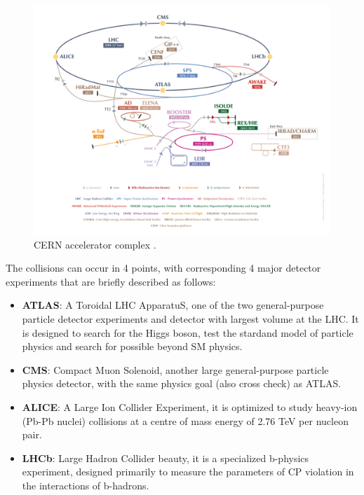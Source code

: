 \begin{figure}[!htb]
  \centering
  \includegraphics[width=1.0\textwidth]{figures/Detector/LHC_v2017.png}
  \caption{CERN accelerator complex \cite{Mobs:2197559}.}
  \label{cern_layout}
\end{figure}

The collisions can occur in 4 points, with corresponding 4 major detector experiments that are briefly described as follows:
\begin{itemize}
	\item \textbf{ATLAS}: A Toroidal LHC ApparatuS, one of the two general-purpose particle detector experiments and detector with largest volume at the LHC. It is designed to search for the Higgs boson, test the stardand model of particle physics and search for possible beyond SM physics.
	\item \textbf{CMS}: Compact Muon Solenoid, another large general-purpose particle physics detector, with the same physics goal (also cross check) as ATLAS.
	\item \textbf{ALICE}: A Large Ion Collider Experiment, it is optimized to study heavy-ion (Pb-Pb nuclei) collisions at a centre of mass energy of 2.76 TeV per nucleon pair.
	\item \textbf{LHCb}: Large Hadron Collider beauty, it is a specialized b-physics experiment, designed primarily to measure the parameters of CP violation in the interactions of b-hadrons.
\end{itemize}


